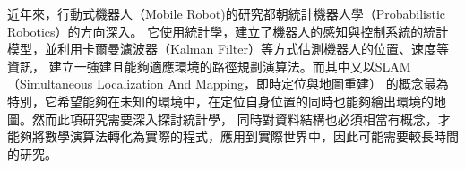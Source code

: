 近年來，行動式機器人（Mobile Robot)的研究都朝統計機器人學（Probabilistic Robotics）的方向深入。
它使用統計學，建立了機器人的感知與控制系統的統計模型，並利用卡爾曼濾波器（Kalman Filter）等方式估測機器人的位置、速度等資訊，
建立一強建且能夠適應環境的路徑規劃演算法。而其中又以SLAM（Simultaneous Localization And Mapping，即時定位與地圖重建）
的概念最為特別，它希望能夠在未知的環境中，在定位自身位置的同時也能夠繪出環境的地圖。然而此項研究需要深入探討統計學，
同時對資料結構也必須相當有概念，才能夠將數學演算法轉化為實際的程式，應用到實際世界中，因此可能需要較長時間的研究。


